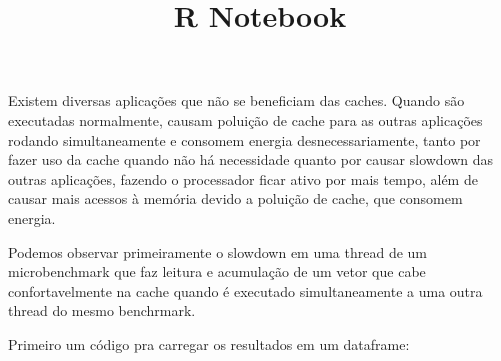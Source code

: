 \documentclass[
]{article}
\title{R Notebook}
\author{}
\date{\vspace{-2.5em}}
\begin{document}
\maketitle

Existem diversas aplicações que não se beneficiam das caches. Quando são
executadas normalmente, causam poluição de cache para as outras
aplicações rodando simultaneamente e consomem energia
desnecessariamente, tanto por fazer uso da cache quando não há
necessidade quanto por causar slowdown das outras aplicações, fazendo o
processador ficar ativo por mais tempo, além de causar mais acessos à
memória devido a poluição de cache, que consomem energia.

Podemos observar primeiramente o slowdown em uma thread de um
microbenchmark que faz leitura e acumulação de um vetor que cabe
confortavelmente na cache quando é executado simultaneamente a uma outra
thread do mesmo benchrmark.

Primeiro um código pra carregar os resultados em um dataframe:
\end{document}
